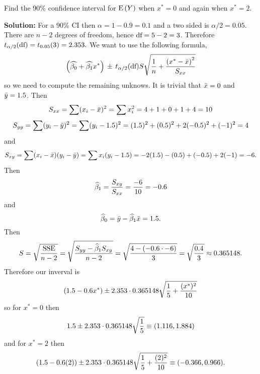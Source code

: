 Find the 90\% confidence interval for $\E{Y}$ when $x^* = 0$ and again when $x^* = 2$.

\nnl \textbf{Solution: } For a 90\% CI then $\alpha = 1 - 0.9 = 0.1$ and a two sided is $\alpha/2 = 0.05$. There are $n-2$ degrees of freedom, hence $\text{df} = 5-2 = 3$. Therefore $t_{\alpha/2}(\text{df}) = t_{0.05}(3) = 2.353.$ We want to use the following formula,
$$\pars{\widehat{\beta_0} + \widehat{\beta_1} x^*} \, \pm \, t_{\alpha/2}(\text{df})S \displaystyle \sqrt{\over{n} + \dfrac{\pars{x^* - \bar x}^2}{S_{xx}}}$$
so we need to compute the remaining unknows. It is trivial that $\bar{x} = 0$ and $\bar{y} = 1.5$. Then
$$S_{xx} = \sum (x_i-\bar{x})^2 = \sum x_i^2 = 4 + 1 + 0 + 1 + 4 = 10$$
$$S_{yy} = \sum (y_i-\bar{y})^2 = \sum (y_i-1.5)^2 =  (1.5)^2 + (0.5)^2 + 2(-0.5)^2 + (-1)^2 = 4$$
and 
$$S_{xy} = \sum (x_i-\bar{x})(y_i-\bar{y}) = \sum x_i(y_i-1.5) = -2(1.5) - (0.5) + (-0.5) + 2(-1) = -6.$$
Then 
$$\widehat{\beta}_1 = \frac{S_{xy}}{S_{xx}} = \frac{-6}{10} = -0.6$$
and
$$\widehat{\beta}_0 = \bar{y} - \widehat{\beta}_1 \bar{x} = 1.5.$$
Then
$$S = \sqrt{\dfrac{\operatorname{SSE}}{n-2}} =  \sqrt{ \dfrac{S_{yy} - \widehat{\beta}_1 S_{xy}} {n-2}} = \sqrt{ \dfrac{4- (-0.6 \cdot -6)}{3} } = \sqrt{\frac{0.4}{3}} \approx  0.365148.$$
Therefore our inverval is
$$(1.5 - 0.6x^*) \pm 2.353\cdot  0.365148 \sqrt{\over{5} + \frac{(x^*)^2}{10}}$$
so for $x^* = 0$ then 
$$1.5 \pm 2.353\cdot  0.365148 \sqrt{\over{5}} \equiv (1.116, 1.884)$$
and for $x^* = 2$ then 
$$(1.5 - 0.6(2) ) \pm 2.353\cdot  0.365148 \sqrt{\over{5} + \frac{(2)^2}{10}} \equiv (-0.366, 0.966).$$